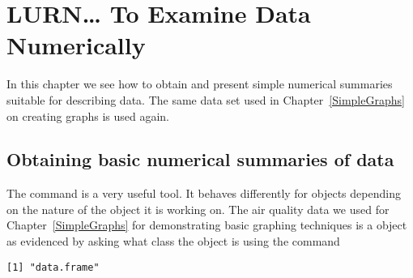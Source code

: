 

 
\chapter{LURN\ldots{} To Examine Data Numerically} 
\label{NumericalEDA} 
 

 
In this chapter we see how to obtain and present simple numerical summaries suitable for describing data. The same data set used in Chapter~\ref{SimpleGraphs} on creating graphs is used again. 
 
\section{Obtaining basic numerical summaries of data} 
 
The  command is a very useful tool. It behaves differently for \R{} objects depending on the nature of the object it is working on. The air quality data we used for Chapter~\ref{SimpleGraphs} for demonstrating basic graphing techniques is a  object as evidenced by asking \R{} what class the object is using the  command 
\begin{knitrout}
\color{fgcolor}\begin{kframe}
\begin{alltt}
\hlstd{> }
\end{alltt}
\begin{verbatim}
[1] "data.frame"
\end{verbatim}
\end{kframe}
\end{knitrout}
 
